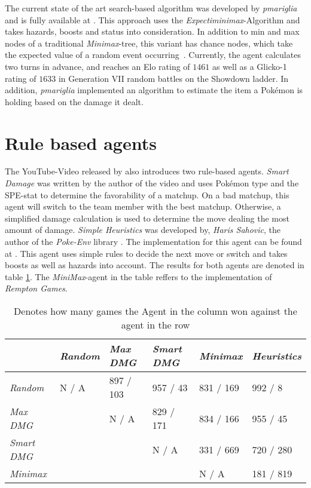 The current state of the art search-based algorithm was developed by \emph{pmariglia} and is fully available
at \cite{Github:pmariglia-showdown}. This approach uses the \textit{Expectiminimax}-Algorithm and takes
hazards, boosts and status into consideration. In addition to \grqq min\grqq{}
and \grqq max\grqq{} nodes of a traditional \emph{Minimax}-tree, this variant has \grqq chance\grqq{} nodes, which take the 
expected value of a random event occurring~\autocite{wiki:Expectiminimax}. Currently, the agent calculates two turns in
advance, and reaches an Elo rating of $1461$ as well as a Glicko-1 rating of $1633$ in Generation VII random battles 
on the Showdown ladder. 
In addition, \emph{pmariglia} implemented an algorithm to estimate the item a Pokémon is holding
based on the damage it dealt. 

\section{Rule based agents}
\label{sec:related-rulebased}
The YouTube-Video released by \cite{RemptonGames:PokemonAI} also introduces two rule-based agents.
\textit{Smart Damage} was written by the author of the video and uses Pokémon type and the \ac{SPE}-stat to determine
the favorability of a matchup. On a bad matchup, this agent will switch to the team member with the best matchup. Otherwise,
a simplified damage calculation is used to determine the move dealing the most amount of damage. \textit{Simple 
Heuristics} was developed by, \emph{Haris Sahovic}, the author of the \emph{Poke-Env} library \cite{PokeEnv:Github}.
The implementation for this agent can be found at \cite{PokeEnv:Baselines}. This agent uses simple rules
to decide the next move or switch and takes boosts as well as hazards into account. The results for both agents
are denoted in table \ref{tbl:Youtube-Results}. The \emph{MiniMax}-agent in the table reffers to the implementation
of \emph{Rempton Games}.
\begin{table}[h]
    \centering
        \begin{tabular}{|l|l|l|l|l|l|}
            \hline
            & \emph{Random} & \emph{Max \ac{DMG}} & \emph{Smart \ac{DMG}} & \emph{Minimax} & \emph{Heuristics} \\
            \hline
            \emph{Random} & N / A & 897 / 103 & 957 / 43 & 831 / 169 & 992 / 8 \\
            \hline
            \emph{Max \ac{DMG}} & & N / A & 829 / 171 & 834 / 166 & 955 / 45 \\
            \hline
            \emph{Smart \ac{DMG}} & & & N / A & 331 / 669 & 720 / 280 \\
            \hline
            \emph{Minimax} & & & & N / A & 181 / 819 \\
            \hline 
        \end{tabular}
        \caption{Denotes how many games the Agent in the column won against the agent in the row \cite{RemptonGames:PokemonAI}}
        \label{tbl:Youtube-Results}
\end{table}

